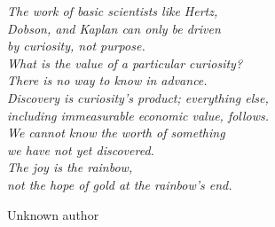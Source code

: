 \clearpage

\thispagestyle{empty}
\null\vfill

\begin{center}
\parbox{9cm}{%
  \raggedright{\normalsize \textit{%
  The work of basic scientists like Hertz, \\
  Dobson, and Kaplan can only be driven \\
  by curiosity, not purpose. \\
  What is the value of a particular curiosity? \\
  There is no way to know in advance. \\
  Discovery is curiosity’s product; everything else, \\
  including immeasurable economic value, follows. \\
  We cannot know the worth of something \\
  we have not yet discovered. \\
  The joy is the rainbow, \\
  not the hope of gold at the rainbow’s end.}\par\bigskip
  }   
  \raggedleft\small Unknown author\par%
}
\vfill\vfill
\end{center}
\clearpage